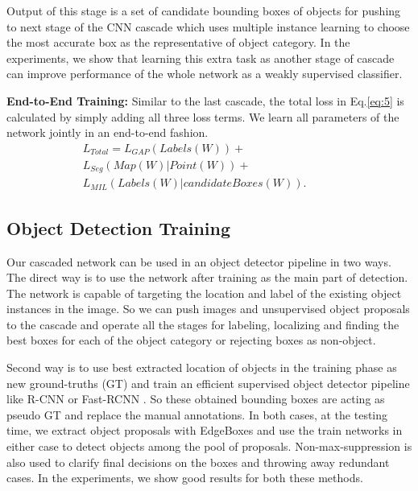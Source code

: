 \documentclass[10pt,twocolumn,letterpaper]{article}
\begin{document}
Output of this stage is a set of candidate bounding boxes of objects for pushing to next stage of the CNN cascade which uses multiple instance learning to choose the most accurate box as the representative of object category.  In the experiments, we show that learning this extra task as another stage of cascade can improve performance of the whole network as a weakly supervised classifier.

\textbf{End-to-End Training:}
Similar to the last cascade, the total loss in Eq.\ref{eq:5} is calculated by simply adding all three loss terms. We learn all parameters of the network jointly in an end-to-end fashion.
\begin{equation}
\begin{split}
L_{Total} = L_{GAP}(Labels(W))+ \qquad  \qquad  \qquad \qquad \\
L_{Seg}(Map(W)|Point(W))+ \qquad \qquad \quad \\
L_{MIL}(Labels(W)|candidate Boxes(W)).
\label{eq:5}
\end{split}
\end{equation}



\subsection{Object Detection Training}
Our cascaded network can be used in an object detector pipeline in two ways. The direct way is to use the network after training as the main part of detection. The network is capable of targeting the location and label of the existing object instances in the image. So we can push images and unsupervised object proposals to the cascade and operate all the stages for labeling, localizing and finding the best boxes for each of the object category or rejecting boxes as non-object. 

Second way is to use best extracted location of objects in the training phase as new ground-truths (GT) and train an efficient supervised object detector pipeline like R-CNN or Fast-RCNN \cite{fastRCNN}. So these obtained bounding boxes are acting as pseudo GT and replace the manual annotations. In both cases, at the testing time, we extract object proposals with EdgeBoxes \cite{edgebox} and use the train networks in either case to detect objects among the pool of proposals. Non-max-suppression is also used to clarify final decisions on the boxes and throwing away redundant cases. In the experiments, we show good results for both these methods.   
\end{document}
